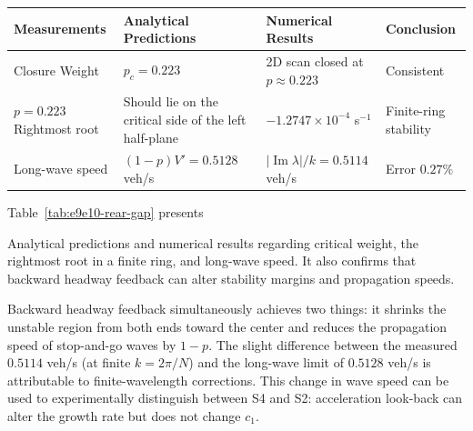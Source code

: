 \documentclass[11pt,a4paper,openany]{book}
\numberwithin{equation}{chapter}
\numberwithin{figure}{chapter}
\numberwithin{table}{chapter}
\newcommand{\tabletext}[2]{%
  \par\smallskip\noindent
  Table~\ref{#1} presents #2
\par\smallskip
}
\begin{document}
\begin{center}
\small
{}
\label{tab:e9e10-rear-gap}
\begin{tabular}{p{3.2cm}p{4.3cm}p{4.3cm}p{2.0cm}}
\toprule
\textbf{Measurements} & \textbf{Analytical Predictions} & \textbf{Numerical Results} & \textbf{Conclusion} \\
\midrule







Closure Weight




& $p_c=0.223$ &




 2D scan closed at $p\approx0.223$




&




 Consistent




\\[3pt]
$p=0.223$ Rightmost root

&

Should lie on the critical side of the left half-plane

& $-1.2747\times10^{-4}$ s$^{-1}$ &

Finite-ring stability
\\[3pt]
Long-wave speed

& $(1-p)V'=0.5128$ veh/s & $|\operatorname{Im}\lambda|/k=0.5114$ veh/s &

Error $0.27\%$
\\
\bottomrule
\end{tabular}
\end{center}
\tabletext{tab:e9e10-rear-gap}{

Analytical predictions and numerical results regarding critical weight, the rightmost root in a finite ring, and long-wave speed. It also confirms that backward headway feedback can alter stability margins and propagation speeds.
}

\begin{tcolorbox}[resultbox,title=\textbf{Verification of conclusions}]
Backward headway feedback simultaneously achieves two things: it shrinks the unstable region from both ends toward the center and reduces the propagation speed of stop-and-go waves by $1-p$. The slight difference between the measured $0.5114$ veh/s (at finite $k=2\pi/N$) and the long-wave limit of $0.5128$ veh/s is attributable to finite-wavelength corrections. This change in wave speed can be used to experimentally distinguish between S4 and S2: acceleration look-back can alter the growth rate but does not change $c_1$.


\end{tcolorbox}
\end{document}
